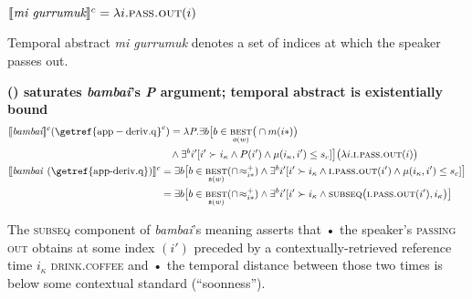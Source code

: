 $ \denote[c]{\textit{mi gurrumuk}} = \lambda i.\textsc{pass.out}(i)$%

Temporal abstract \textit{mi gurrumuk} denotes a set of indices at which the speaker passes out.



\a \textbf{ () saturates \textit{bambai}'s \textit{P} argument; temporal abstract is existentially bound}
\begin{align*}
	&\begin{aligned}
	\denote[c]{\textit{bambai}}(\mathrm{\getref{app-deriv.q}}^c )&=\lambda\textit{P}.\exists b	\big[b\in\underset{o(w)}{\textsc{best}}\big(\cap m(i*)\big)\\&\wedge \exists^bi'[i'\succ i_\kappa\wedge P(i')\wedge\mu(i_\kappa,i')\leq s_c]\big]\big(\lambda i.\textsc{i.pass.out}(i)\big)\end{aligned}\\
&\begin{aligned}\denote[c]{\textit{bambai \textup{(\getref{app-deriv.q})}}}&=\exists b\big[b\in\underset{\mathfrak s(w)}{\textsc{best}}(\cap\!\approx^+_{i*})\wedge \exists^bi'[i'\succ i_\kappa\wedge\textsc{i.pass.out}(i')\wedge\mu(i_\kappa,i')\leq s_c]\big]\\
	&=\exists b\big[b\in\underset{\mathfrak s(w)}{\textsc{best}}(\cap\!\approx^+_{i*})\wedge \exists^bi'[i'\succ i_\kappa\wedge \textsc{subseq}\big(\textsc{i.pass.out}(i'),i_\kappa\big)\big]\end{aligned}
\end{align*}




The \textsc{subseq} component of \textit{bambai}'s meaning asserts that • the speaker's \textsc{passing out} obtains at some index $ (i') $ preceded by a contextually-retrieved reference time $ i_\kappa $ \textsc{drink.coffee} and • the temporal distance between those two times is below some contextual standard (``soonness'').%


